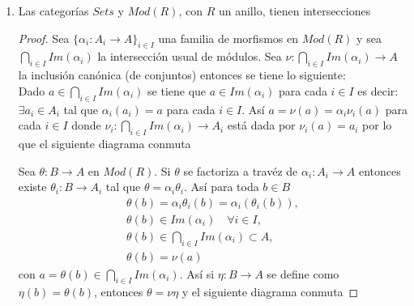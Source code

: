 \documentclass{article}
\begin{document}
\begin{enumerate}[label=\textbf{Ej \arabic*.}]
\begin{proof}
Por último, si $\eta:A_2\times^AA_1\longrightarrow P$ es otro morfismo tal que \\$\eta\mu_1=\beta_1$\,\,y\,\,$\eta\mu_2=\beta_2$, entonces
para cada $(a,b)\in A_2\times^AA_1$
\begin{align*}
\eta(a,b)=\eta[(a,0)+(0,b)]\\
=\eta[\mu_2(a)+\mu_1(b)]\\
=\eta(\mu_2(a))+\eta(\mu_1(b))\\
=\beta_2(a)+\beta_1(b)\\
=\gamma(a,b)
\end{align*}
Por lo que $\gamma=\eta$.
\end{proof}

\item Las categorías $Sets$ y $Mod(R)$, con $R$ un anillo, tienen intersecciones
\begin{proof}
Sea $\{\alpha_i\colon A_i\longrightarrow A\}_{i\in I}$ una familia de morfismos en $Mod(R)$ y sea $\displaystyle\bigcap_{i\in I}Im(\alpha_i)$ la 
intersección usual de módulos. Sea $\nu\colon \displaystyle\bigcap_{i\in I}Im(\alpha_i)\longrightarrow A$ la inclusión canónica (de conjuntos) entonces
se tiene lo siguiente:\\

Dado $a\in\displaystyle\bigcap_{i\in I}Im(\alpha_i)$ se tiene que $a\in Im(\alpha_i)$ para cada $i\in I$ es decir: $\exists  a_i\in A_i$ tal que 
$\alpha_i(a_i)=a$ para cada $i\in I$. Así $a=\nu(a)=\alpha_i\nu_i(a)$ para cada $i\in I$ donde $\nu_i\colon \displaystyle\bigcap_{i\in I}Im(\alpha_i)
\longrightarrow A_i$ está dada por $\nu_i(a)=a_i$ por lo que el siguiente diagrama conmuta

\centerline{}

Sea $\theta\colon B\longrightarrow A$ en $Mod(R)$. Si $\theta$ se factoriza a travéz de $\alpha_i\colon A_i\longrightarrow A$ entonces existe
$\theta_i\colon B\longrightarrow A_i$ tal que $\theta=\alpha_i\theta_i$. Así para toda $b\in B$
\begin{align*}
\theta(b)=\alpha_i\theta_i(b)=\alpha_i(\theta_i(b)),\\
\theta(b)\in Im(\alpha_i)\quad \forall i\in I,\\
\theta(b)\in \displaystyle\bigcap_{i\in I}Im(\alpha_i)\subset A,\\
\theta(b)=\nu(a)
\end{align*}
con $a=\theta(b)\in \displaystyle\bigcap_{i\in I}Im(\alpha_i)$. Así si $\eta\colon B\longrightarrow A$  se define como $\eta(b)=\theta(b)$, entonces 
$\theta=\nu\eta$ y el siguiente diagrama conmuta


\end{proof}
\end{enumerate}
\end{document}
